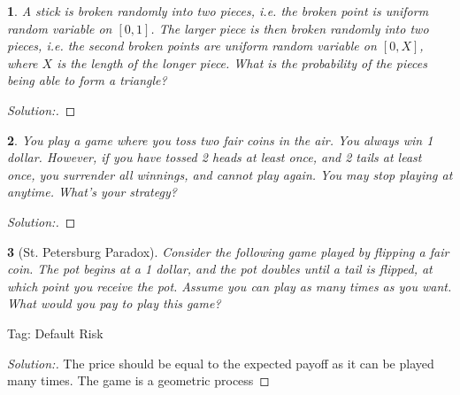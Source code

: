 \documentclass[10pt]{report}
\newtheorem{exe}{}[chapter]
\newenvironment{sol}{\begin{proof}[Solution:]}{\end{proof}}
\begin{document}
\begin{exe}
A stick is broken randomly into two pieces, i.e. the broken point is uniform random variable on $[0, 1]$. The larger piece is then broken randomly into two pieces, i.e. the second broken points are uniform random variable on $[0, X]$, where $X$ is the length of the longer piece. What is the probability of the pieces being able to form a triangle?
\end{exe}
\begin{teacher}
\begin{sol}
\end{sol}
\end{teacher}

\begin{exe}
You play a game where you toss two fair coins in the air. You always win 1 dollar. However, if you have tossed 2 heads at least once, and 2 tails at least once, you surrender all winnings, and cannot play again. You may stop playing at anytime. What's your strategy?
\end{exe}
\begin{teacher}
\begin{sol}
\end{sol}
\end{teacher}

\begin{exe}[St. Petersburg Paradox]
Consider the following game played by flipping a fair coin. The pot begins at a 1 dollar, and the pot doubles until a tail is flipped, at which point you receive the pot. Assume you can play as many times as you want. What would you pay to play this game?
\end{exe}
\begin{teacher}
Tag: Default Risk
\begin{sol}
The price should be equal to the expected payoff as it can be played many times. The game is a geometric process

\end{sol}
\end{teacher}
\end{document}

